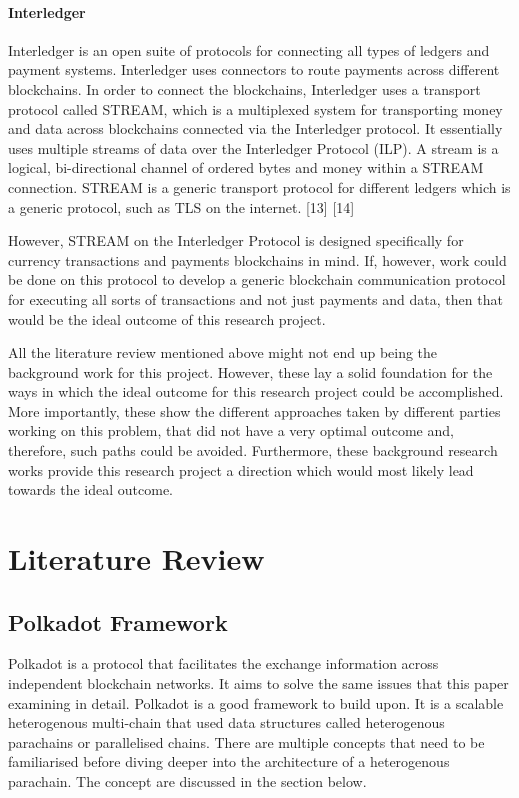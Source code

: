 \documentclass[a4paper,twoside,phd]{BYUPhys}
\begin{document}
\subsubsection{Interledger}
Interledger is an open suite of protocols for connecting all types of ledgers and payment systems. Interledger uses connectors to route payments across different blockchains. In order to connect the blockchains, Interledger uses a transport protocol called STREAM, which is a multiplexed system for transporting money and data across blockchains connected via the Interledger protocol. It essentially uses multiple streams of data over the Interledger Protocol (ILP). A stream is a logical, bi-directional channel of ordered bytes and money within a STREAM connection. STREAM is a generic transport protocol for different ledgers which is a generic protocol, such as TLS on the internet. [13] [14] \par
However, STREAM on the Interledger Protocol is designed specifically for currency transactions and payments blockchains in mind. If, however, work could be done on this protocol to develop a generic blockchain communication protocol for executing all sorts of transactions and not just payments and data, then that would be the ideal outcome of this research project. \par
All the literature review mentioned above might not end up being the background work for this project. However, these lay a solid foundation for the ways in which the ideal outcome for this research project could be accomplished. More importantly, these show the different approaches taken by different parties working on this problem, that did not have a very optimal outcome and, therefore, such paths could be avoided. Furthermore, these background research works provide this research project a direction which would most likely lead towards the ideal outcome.

\chapter{Literature Review}
\label{chap:singleuser}

\section{Polkadot Framework \label{sec:Intro-ChapUserSelec}}
Polkadot is a protocol that facilitates the exchange information across independent blockchain networks. It aims to solve the same issues that this paper examining in detail. Polkadot is a good framework to build upon. It is a scalable heterogenous multi-chain that used data structures called heterogenous parachains or parallelised chains. There are multiple concepts that need to be familiarised before diving deeper into the architecture of a heterogenous parachain. The concept are discussed in the section below.
\end{document}
